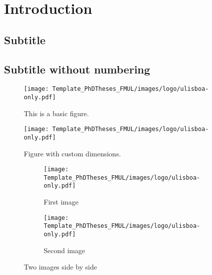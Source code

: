 \chapter{Introduction}

\section{Subtitle}

\section*{Subtitle without numbering}

\lipsum[3] \cite{wickham:2021aa}



\begin{figure}[htbp]
  \centering
  \texttt{[image: Template\_PhDTheses\_FMUL/images/logo/ulisboa-only.pdf]}
  \caption{This is a basic figure.}
  \label{fig:basic}
\end{figure}
 

\begin{figure}[htbp]
  \centering
  \texttt{[image: Template\_PhDTheses\_FMUL/images/logo/ulisboa-only.pdf]}
  \caption{Figure with custom dimensions.}
  \label{fig:customsize}
\end{figure}

\begin{figure}[htbp]
  \centering
  \begin{subfigure}[b]{0.45\textwidth}
    \texttt{[image: Template\_PhDTheses\_FMUL/images/logo/ulisboa-only.pdf]}
    \caption{First image}
    \label{fig:sub1}
  \end{subfigure}
  \hfill
  \begin{subfigure}[b]{0.45\textwidth}
    \texttt{[image: Template\_PhDTheses\_FMUL/images/logo/ulisboa-only.pdf]}
    \caption{Second image}
    \label{fig:sub2}
  \end{subfigure}
  \caption{Two images side by side}
  \label{fig:sidebyside}
\end{figure}

